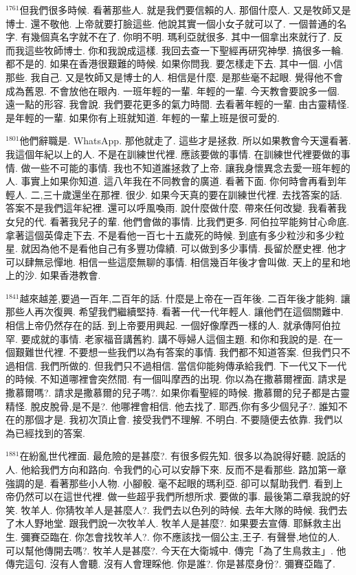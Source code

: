 \documentclass{book}
\begin{document}
$^{1761}$但我們很多時候.
看著那些人.
就是我們要信賴的人.
那個什麼人.
又是牧師又是博士.
還不敬他.
上帝就要打臉這些.
他說其實一個小女子就可以了.
一個普通的名字.
有幾個真名字就不在了.
你明不明.
瑪利亞就很多.
其中一個拿出來就行了.
反而我這些牧師博士.
你和我說成這樣.
我回去查一下聖經再研究神學.
搞很多一輪.
都不是的.
如果在香港很艱難的時候.
如果你問我.
要怎樣走下去.
其中一個.
小信那些.
我自己.
又是牧師又是博士的人.
相信是什麼.
是那些毫不起眼.
覺得他不會成為舊恩.
不會放他在眼內.
一班年輕的一輩.
年輕的一輩.
今天教會要說多一個.
遠一點的形容.
我會說.
我們要花更多的氣力時間.
去看著年輕的一輩.
由古靈精怪.
是年輕的一輩.
如果你有上班就知道.
年輕的一輩上班是很可愛的.

$^{1801}$他們辭職是.
WhatsApp.
那他就走了.
這些才是拯救.
所以如果教會今天還看著.
我這個年紀以上的人.
不是在訓練世代裡.
應該要做的事情.
在訓練世代裡要做的事情.
做一些不可能的事情.
我也不知道誰拯救了上帝.
讓我身懷異念去愛一班年輕的人.
事實上如果你知道.
這八年我在不同教會的廣道.
看著下面.
你何時會再看到年輕人.
二,三十歲還坐在那裡.
很少.
如果今天真的要在訓練世代裡.
去找答案的話.
答案不是我們這年紀裡.
還可以呼風喚雨.
說什麼做什麼.
帶來任何改變.
我看著我女兒的代.
看著我兒子的輩.
他們會做的事情.
比我們更多.
阿伯拉罕能夠甘心命底.
拿著這個英偉走下去.
不是看他一百七十五歲死的時候.
到底有多少粒沙和多少粒星.
就因為他不是看他自己有多豐功偉績.
可以做到多少事情.
長留於歷史裡.
他才可以肆無忌憚地.
相信一些這麼無聊的事情.
相信幾百年後才會叫做.
天上的星和地上的沙.
如果香港教會.

$^{1841}$越來越差,要過一百年,二百年的話.
什麼是上帝在一百年後.
二百年後才能夠.
讓那些人再次復興.
希望我們繼續堅持.
看著一代一代年輕人.
讓他們在這個關難中.
相信上帝仍然存在的話.
到上帝要用興起.
一個好像摩西一樣的人.
就承傳阿伯拉罕.
要成就的事情.
老家福音講舊約.
講不辱婦人這個主題.
和你和我說的是.
在一個艱難世代裡.
不要想一些我們以為有答案的事情.
我們都不知道答案.
但我們只不過相信.
我們所做的.
但我們只不過相信.
當信仰能夠傳承給我們.
下一代又下一代的時候.
不知道哪裡會突然間.
有一個叫摩西的出現.
你以為在撒慕爾裡面.
請求是撒慕爾嗎?.
請求是撒慕爾的兒子嗎?.
如果你看聖經的時候.
撒慕爾的兒子都是古靈精怪.
脫皮脫骨,是不是?.
他哪裡會相信.
他去找了.
耶西,你有多少個兒子?.
誰知不在的那個才是.
我初次頂止會.
接受我們不理解.
不明白.
不要隨便去依靠.
我們以為已經找到的答案.

$^{1881}$在紛亂世代裡面.
最危險的是甚麼?.
有很多假先知.
很多以為說得好聽.
說話的人.
他給我們方向和路向.
令我們的心可以安靜下來.
反而不是看那些.
路加第一章強調的是.
看著那些小人物.
小腳骰.
毫不起眼的瑪利亞.
卻可以幫助我們.
看到上帝仍然可以在這世代裡.
做一些超乎我們所想所求.
要做的事.
最後第二章我說的好笑.
牧羊人.
你猜牧羊人是甚麼人?.
我們去以色列的時候.
去年大隊的時候.
我們去了木人野地堂.
跟我們說一次牧羊人.
牧羊人是甚麼?.
如果要去宣傳.
耶穌救主出生.
彌賽亞臨在.
你怎會找牧羊人?.
你不應該找一個公主,王子.
有聲譽,地位的人.
可以幫他傳開去嗎?.
牧羊人是甚麼?.
今天在大衛城中.
傳完「為了生鳥救主」.
他傳完這句.
沒有人會聽.
沒有人會理睬他.
你是誰?.
你是甚麼身份?.
彌賽亞臨了.
\end{document}
